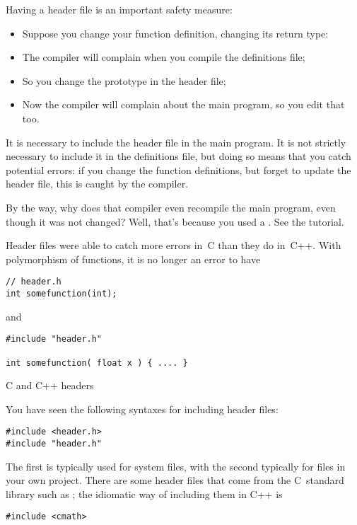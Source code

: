Having a header file is an important safety measure:
\begin{itemize}
\item Suppose you change your function definition, changing its return
  type:
\item The compiler will complain when you compile the definitions
  file;
\item So you change the prototype in the header file;
\item Now the compiler will complain about the main program, so you
  edit that too.
\end{itemize}

It is necessary to include the header file in the main program. It is
not strictly necessary to include it in the definitions file, but
doing so means that you catch potential errors: if you change the
function definitions, but forget to update the header file, this is
caught by the compiler.

\begin{remark}
  By the way, why does that compiler even recompile the main program,
  even though it was not changed? Well, that's because you used a
  . See the tutorial.
\end{remark}
\begin{remark}
  Header files were able to catch more errors in~C than they do
  in~C++. With polymorphism of functions, it is no longer an error to
  have 
\begin{verbatim}
// header.h
int somefunction(int);
\end{verbatim}
and
\begin{verbatim}
#include "header.h"

int somefunction( float x ) { .... }
\end{verbatim}
\end{remark}

 {C and C++ headers}

You have seen the following syntaxes for including header files:
\begin{verbatim}
#include <header.h>
#include "header.h"
\end{verbatim}
The first is typically used for system files, with the second
typically for files in your own project. There are some header files
that come from the C~standard library such as ; the
idiomatic way of including them in C++ is
\begin{verbatim}
#include <cmath>
\end{verbatim}

